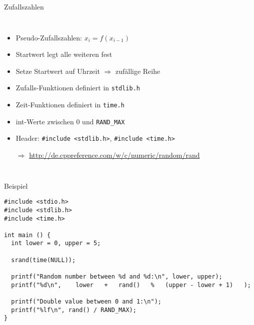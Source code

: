 \begin{frame}[fragile]{Zufallszahlen}
%
\begin{columns}[T]
\begin{itemize}
\item Pseudo-Zufallszahlen: $x_i = f(x_{i-1})$
\item Startwert legt alle weiteren fest
\item Setze Startwert auf Uhrzeit\newline
	$\Rightarrow$ zufällige Reihe
\item Zufalls-Funktionen definiert in \texttt{stdlib.h}
\item Zeit-Funktionen definiert in \texttt{time.h}
\item int-Werte zwischen 0 und \texttt{RAND\_MAX}
\item Header: \texttt{#include <stdlib.h>}, \texttt{#include <time.h>}
\item[$\Rightarrow$] \url{http://de.cppreference.com/w/c/numeric/random/rand}
\end{itemize}
%
%
\begin{codebox}
\end{codebox}
%
\begin{codebox}
\end{codebox}
%
\begin{codebox}
\end{codebox}
\end{columns}
%
\end{frame}


\begin{frame}[fragile]{Beispiel}
%
\begin{codebox}
\begin{verbatim}
#include <stdio.h>
#include <stdlib.h>
#include <time.h>

int main () {
  int lower = 0, upper = 5;
  
  srand(time(NULL));
  
  printf("Random number between %d and %d:\n", lower, upper);
  printf("%d\n",    lower   +   rand()   %   (upper - lower + 1)   );
  
  printf("Double value between 0 and 1:\n");
  printf("%lf\n", rand() / RAND_MAX);
}
\end{verbatim}
\end{codebox}
%
\end{frame}